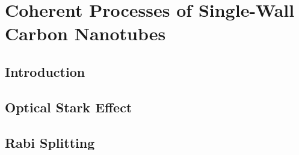 \chapter{Coherent Processes of Single-Wall Carbon Nanotubes}

\section{Introduction}

\section{Optical Stark Effect}

\section{Rabi Splitting}
